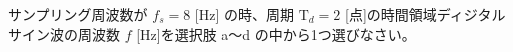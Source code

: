 サンプリング周波数が $f_s = 8$ [Hz] の時、周期 $\textrm{T}_d = 2$ [点]の時間領域ディジタルサイン波の周波数 $f$ [Hz]を選択肢 a〜d の中から1つ選びなさい。
